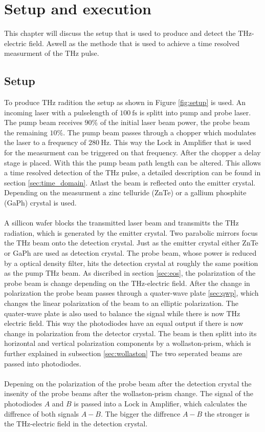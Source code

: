 \chapter{Setup and execution}
This chapter will discuss the setup that is used to produce and detect the $\si{\tera\hertz}$-electric field.
Aswell as the methode that is used to achieve a time resolved measurment of the $\si{\tera\hertz}$ pulse.

\section{Setup}
\label{sec:setup}
To produce $\si{\tera\hertz}$ radition the setup as shown in Figure \ref{fig:setup} is used.
An incoming laser with a pulselength of $\SI{100}{\femto\second}$ is splitt into pump and probe laser.
The pump beam receives $90\%$ of the initial laser beam power, the probe beam the remaining $10\%$.
The pump beam passes through a chopper which modulates the laser to a frequency of $\SI{280}{\hertz}$.
This way the Lock in Amplifier that is used for the measurment can be triggered on that frequency.
After the chopper a delay stage is placed.
With this the pump beam path length can be altered.
This allows a time resolved detection of the $\si{\tera\hertz}$ pulse, a detailed description can be found in section \ref{sec:time_domain}.
Atlast the beam is reflected onto the emitter crystal.
Depending on the measurment a zinc telluride (ZnTe) or a gallium phosphite (GaPh) crystal is used.
\\\\
A sillicon wafer blocks the transmitted laser beam and transmitts the $\si{\tera\hertz}$ radiation, which is generated by the emitter crystal.
Two parabolic mirrors focus the $\si{\tera\hertz}$ beam onto the detection crystal.
Just as the emitter crystal either ZnTe or GaPh are used as detection crystal.
The probe beam, whose power is reduced by a optical density filter, hits the detection crystal at roughly the same position as the pump $\si{\tera\hertz}$ beam.
As discribed in section \ref{sec:eos}, the polarization of the probe beam is change depending on the $\si{\tera\hertz}$-electric field.
After the change in polarization the probe beam passes through a quater-wave plate \ref{sec:qwp}, which changes the linear polarization of the beam to an elliptic polarization.
The quater-wave plate is also used to balance the signal while there is now $\si{\tera\hertz}$ electric field.
This way the photodiodes have an equal output if there is now change in polarization from the detector crystal.
The beam is then splitt into its horizontal and vertical polarization components by a wollaston-prism, which is further explained in subsection \ref{sec:wollaston}
The two seperated beams are passed into photodiodes.
\\\\
Depening on the polarization of the probe beam after the detection crystal the insenity of the probe beams after the wollaston-prism change.
The signal of the photodiodes $A$ and $B$ is passed into a Lock in Amplifier, which calculates the diffrence of both signals $A-B$.
The bigger the diffrence $A-B$ the stronger is the $\si{\tera\hertz}$-electric field in the detection crystal.
\FloatBarrier
